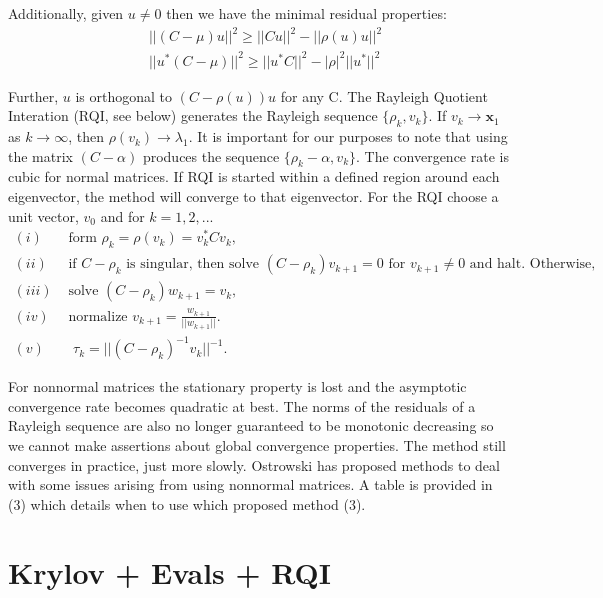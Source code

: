 \documentclass[12pt,twoside]{book}
\begin{document}
   Additionally, given $u \ne 0$ then we have the minimal residual properties:
   \begin{align*}
      &||(C - \mu)u||^{2} \ge ||Cu||^{2} - ||\rho(u)u||^{2} \\
      &||u^{*}(C - \mu)||^{2} \ge ||u^{*}C||^{2} - |\rho|^{2}||u^{*}||^{2}
   \end{align*}
   
   Further, $u$ is orthogonal to $(C - \rho(u))u$ for any C. The Rayleigh Quotient Interation (RQI, see below) generates the Rayleigh sequence $\{\rho_{k}, v_{k}\}$. If $v_{k} \to \boldsymbol{x}_{1}$ as $k \to \infty$, then $\rho(v_{k}) \to \lambda_{1}$. It is important for our purposes to note that using the matrix $(C - \alpha)$ produces the sequence $\{\rho_{k} - \alpha, v_{k}\}$. The convergence rate is cubic for normal matrices. If RQI is started within a defined region around each eigenvector, the method will converge to that eigenvector. For the RQI choose a unit vector, $v_{0}$ and for $k = 1,2,...$  
   \begin{align*}
      (i)& \text{  form  } \rho_{k} = \rho(v_{k}) = v_{k}^{*}Cv_{k}, \\
      (ii)& \text{  if  } C - \rho_{k} \text{  is singular, then solve  } (C - \rho_{k})v_{k+1} = 0 \text{  for  } v_{k+1} \ne 0 \text{  and halt. Otherwise, } \\
      (iii)& \text{  solve  } (C - \rho_{k})w_{k+1} = v_{k}, \\
      (iv)& \text{  normalize  } v_{k+1} = \frac{w_{k+1}}{||w_{k+1}||}. \\
      (v)& \text{  } \tau_{k} = || (C - \rho_{k})^{-1}v_{k}||^{-1}.
   \end{align*}
   
   For nonnormal matrices the stationary property is lost and the asymptotic convergence rate becomes quadratic at best. The norms of the residuals of a Rayleigh sequence are also no longer guaranteed to be monotonic decreasing so we cannot make assertions about global convergence properties. The method still converges in practice, just more slowly. Ostrowski has proposed methods to deal with some issues arising from using nonnormal matrices. A table is provided in (3) which details when to use which proposed method (3). 
   
\section{Krylov + Evals + RQI}   
\end{document}
